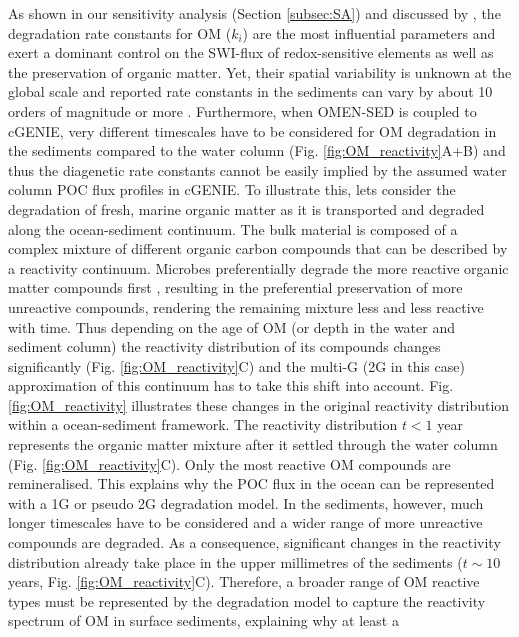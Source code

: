 \documentclass[gmd, manuscript]{copernicus}
\begin{document}
As shown in our sensitivity analysis (Section \ref{subsec:SA}) and discussed by \citet{arndt_quantifying_2013}, the 
degradation rate constants for OM ($k_i$) are the most influential parameters and exert a dominant control on the SWI-flux of redox-sensitive elements as well as the preservation of organic matter. 
Yet, their spatial variability is unknown at the global scale and reported rate constants in the sediments can vary by about 10 orders of magnitude or more \citep{middelburg_organic_1993, arndt_quantifying_2013}. 
Furthermore, when OMEN-SED is coupled to cGENIE, very different timescales have to be considered for OM degradation in the sediments compared to the water column (Fig. \ref{fig:OM_reactivity}A+B) and thus the diagenetic rate constants cannot 
be easily implied by the assumed water column POC flux profiles in cGENIE. To illustrate this, lets consider the degradation of fresh, marine organic matter as it is transported and degraded along the ocean-sediment continuum. 
The bulk material is composed of a complex mixture of different organic carbon compounds that can be described by a reactivity continuum. Microbes preferentially degrade the more reactive organic matter compounds 
first \citep{emerson_processes_1988, wakeham_compositions_1997, lee_composition_2000}, resulting in the preferential preservation of more unreactive compounds, rendering the remaining mixture less and less reactive with time. 
Thus depending on the age of OM (or depth in the water and sediment column) the reactivity distribution of its compounds changes significantly (Fig. \ref{fig:OM_reactivity}C) and the multi-G (2G in this case) approximation of this continuum 
has to take this shift into account. Fig. \ref{fig:OM_reactivity} illustrates these changes in the original reactivity distribution within a ocean-sediment framework. The reactivity distribution $t<1$ year represents the organic matter mixture 
after it settled through the water column (Fig. \ref{fig:OM_reactivity}C). Only the most reactive OM compounds are remineralised. This explains why the POC flux in the ocean can be represented with a 1G or pseudo 2G degradation model. 
In the sediments, however, much longer timescales have to be considered and a wider range of more unreactive compounds are degraded. As a consequence, significant changes in the reactivity distribution already take place in the upper millimetres of the 
sediments ($t \sim 10$ years, Fig. \ref{fig:OM_reactivity}C). Therefore, a broader range of OM reactive types must be represented by the degradation model to capture the reactivity spectrum of OM in surface sediments, explaining why at least a 
\end{document}

